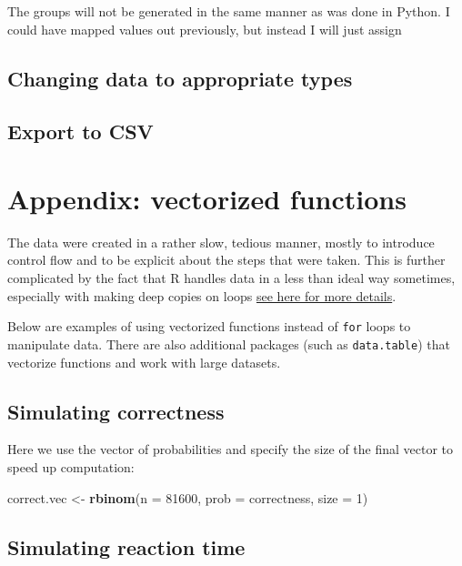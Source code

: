 \documentclass[]{article}
\newenvironment{Shaded}{\begin{snugshade}}{\end{snugshade}}
\newcommand{\KeywordTok}[1]{\textcolor[rgb]{0.13,0.29,0.53}{\textbf{{#1}}}}
\newcommand{\DataTypeTok}[1]{\textcolor[rgb]{0.13,0.29,0.53}{{#1}}}
\newcommand{\DecValTok}[1]{\textcolor[rgb]{0.00,0.00,0.81}{{#1}}}
\newcommand{\StringTok}[1]{\textcolor[rgb]{0.31,0.60,0.02}{{#1}}}
\newcommand{\NormalTok}[1]{{#1}}
\begin{document}
The groups will not be generated in the same manner as was done in
Python. I could have mapped values out previously, but instead I will
just assign

\subsection{Changing data to appropriate
types}\label{changing-data-to-appropriate-types}

\subsection{Export to CSV}\label{export-to-csv}

\section{Appendix: vectorized
functions}\label{appendix-vectorized-functions}

The data were created in a rather slow, tedious manner, mostly to
introduce control flow and to be explicit about the steps that were
taken. This is further complicated by the fact that R handles data in a
less than ideal way sometimes, especially with making deep copies on
loops \href{http://adv-r.had.co.nz/memory.html}{see here for more
details}.

Below are examples of using vectorized functions instead of \texttt{for}
loops to manipulate data. There are also additional packages (such as
\texttt{data.table}) that vectorize functions and work with large
datasets.

\subsection{Simulating correctness}\label{simulating-correctness}

Here we use the vector of probabilities and specify the size of the
final vector to speed up computation:

\begin{Shaded}
\begin{Highlighting}[]
\NormalTok{correct.vec <-}\StringTok{ }\KeywordTok{rbinom}\NormalTok{(}\DataTypeTok{n =} \DecValTok{81600}\NormalTok{, }\DataTypeTok{prob =} \NormalTok{correctness, }\DataTypeTok{size =} \DecValTok{1}\NormalTok{)}
\end{Highlighting}
\end{Shaded}

\subsection{Simulating reaction time}\label{simulating-reaction-time}
\end{document}
